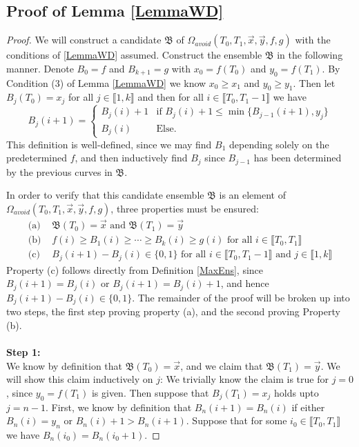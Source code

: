 \subsection{Proof of Lemma \ref{LemmaWD}} 
	\begin{proof}
		We will construct a candidate $\mathfrak{B}$ of $\Omega_{avoid}(T_0,T_1,\vec x,\vec y, f,g)$ with the conditions of \ref{LemmaWD} assumed. Construct the ensemble $\mathfrak{B}$ in the following manner. Denote $B_0=f$ and $B_{k+1}=g$ with $x_0=f(T_0)$ and $y_0=f(T_1)$. By Condition (3) of Lemma \ref{LemmaWD} we know $x_0\geq x_1$ and $y_0\geq y_1$. Then let $B_j(T_0)=x_j$ for all $j\in \llbracket 1,k\rrbracket$ and then for all $i\in \llbracket T_0, T_{1}-1\rrbracket$ we have \begin{equation}\label{MaxEns}
		B_j(i+1)=\begin{cases}
		B_j(i)+1 & \text{if } B_j(i)+1\leq \min\{B_{j-1}(i+1),y_j\}\\
		B_j(i) &\text{Else.}
		\end{cases}
		\end{equation} This definition is well-defined, since we may find $B_1$ depending solely on the predetermined $f$, and then inductively find $B_j$ since $B_{j-1}$ has been determined by the previous curves in $\mathfrak{B}$.
		
		In order to verify that this candidate ensemble $\mathfrak{B}$ is an element of $\Omega_{avoid}(T_0,T_1,\vec x,\vec y,f,g)$, three properties must be ensured:
		\begin{equation}\label{nonEmpCond}
		\begin{split}
		\text{(a) } &\mathfrak{B}(T_0)=\vec x\text{ and }\mathfrak{B}(T_1)=\vec y\\
		\text{(b) } &f(i)\geq B_1(i)\geq \cdots \geq B_k(i)\geq g(i)\text{ for all }i\in \llbracket T_0,T_1\rrbracket\\
		\text{(c) } &B_{j}(i+1)-B_j(i)\in \{0,1\}\text{ for all }i\in \llbracket T_0,T_1-1\rrbracket\text{ and }j\in \llbracket 1,k\rrbracket
		\end{split}
		\end{equation} Property (c) follows directly from Definition \ref{MaxEns}, since $B_{j}(i+1)=B_j(i)$ or $B_{j}(i+1)=B_j(i)+1$, and hence $B_j(i+1)-B_j(i)\in \{0,1\}$. The remainder of the proof will be broken up into two steps, the first step proving property (a), and the second proving Property (b).\\\\
		\noindent\textbf{Step 1:}\\
		We know by definition that $\mathfrak{B}(T_0)=\vec x$, and we claim that $\mathfrak{B}(T_1)=\vec y$. We will show this claim inductively on $j$: We trivially know the claim is true for $j=0$, since $y_0=f(T_1)$ is given. Then suppose that $B_j(T_1)=x_j$ holds upto $j=n-1$. First, we know by definition that $B_{n}(i+1)=B_{n}(i)$ if either $B_{n}(i)=y_{n}$ or $B_{n}(i)+1>B_{n}(i+1)$.  Suppose that for some $i_0\in \llbracket{T_0,T_1}\rrbracket$ we have $B_n(i_0)=B_n(i_0+1)$.
		

\end{proof}
